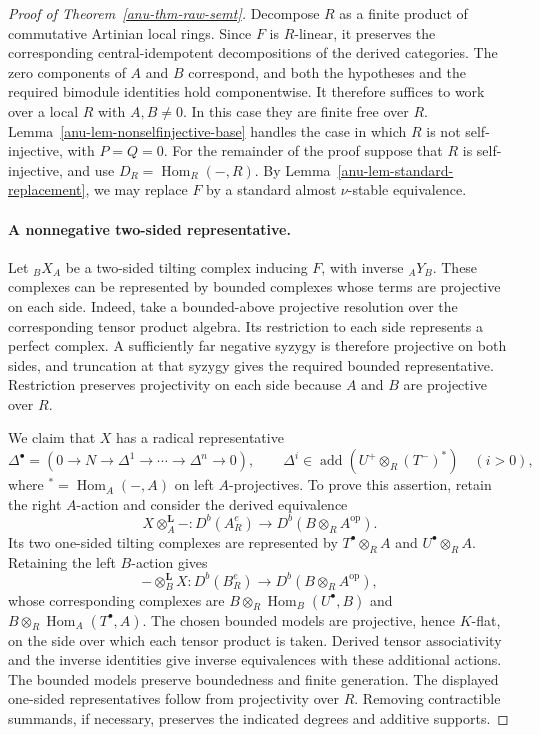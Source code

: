 \documentclass[12pt,a4paper,english,reqno]{amsart}
\numberwithin{equation}{section}
\theoremstyle{plain}
\theoremstyle{definition}
\begin{document}
\begin{proof}[Proof of Theorem~\ref{anu-thm-raw-semt}]
Decompose $R$ as a finite product of commutative Artinian local
rings.  Since $F$ is $R$-linear, it preserves the corresponding
central-idempotent decompositions of the derived categories.
The zero components of $A$ and $B$ correspond, and both the
hypotheses and the required bimodule identities hold componentwise.
It therefore suffices to work over a local $R$ with $A,B\ne0$.
In this case they are finite free over $R$.
Lemma~\ref{anu-lem-nonselfinjective-base} handles the case in which
$R$ is not self-injective, with $P=Q=0$.
For the remainder of the proof suppose that $R$ is self-injective,
and use $D_R=\operatorname{Hom}_R(-,R)$.
By Lemma~\ref{anu-lem-standard-replacement}, we may replace $F$ by
a standard almost $\nu$-stable equivalence.

\paragraph{A nonnegative two-sided representative.}
Let ${}_BX_A$ be a two-sided tilting complex inducing $F$, with
inverse ${}_AY_B$.  These complexes can be represented by bounded
complexes whose terms are projective on each side.  Indeed, take a bounded-above projective resolution over the
corresponding tensor product algebra.  Its restriction to each
side represents a perfect complex.  A sufficiently far negative
syzygy is therefore projective on both sides, and truncation at
that syzygy gives the required bounded representative.
Restriction preserves projectivity on each side because $A$ and
$B$ are projective over $R$.

We claim that $X$ has a radical representative
\begin{equation}\label{anu-eq-Delta}
 \Delta^\bullet=(0\longrightarrow N\longrightarrow\Delta^1
 \longrightarrow\cdots\longrightarrow\Delta^n\longrightarrow0),
 \qquad
 \Delta^i\in\operatorname{add}(U^+\otimes_R(T^-)^*)
 \quad(i>0),
\end{equation}
where ${}^*=\operatorname{Hom}_A(-,A)$ on left $A$-projectives.
To prove this assertion, retain the right $A$-action and consider
the derived equivalence
\[
 X\otimes_A^{\mathbf L}-:
 D^b(A_R^e)\longrightarrow D^b(B\otimes_RA^{\mathrm{op}}).
\]
Its two one-sided tilting complexes are represented by
$T^\bullet\otimes_RA$ and $U^\bullet\otimes_RA$.
Retaining the left $B$-action gives
\[
 -\otimes_B^{\mathbf L}X:
 D^b(B_R^e)\longrightarrow D^b(B\otimes_RA^{\mathrm{op}}),
\]
whose corresponding complexes are
$B\otimes_R\operatorname{Hom}_B(U^\bullet,B)$ and
$B\otimes_R\operatorname{Hom}_A(T^\bullet,A)$.
The chosen bounded models are projective, hence $K$-flat, on the
side over which each tensor product is taken.  Derived tensor associativity and the inverse identities give
inverse equivalences with these additional actions.  The bounded
models preserve boundedness and finite generation.  The displayed
one-sided representatives follow from projectivity over $R$.
Removing contractible summands, if necessary, preserves the
indicated degrees and additive supports.


\end{proof}
\end{document}
